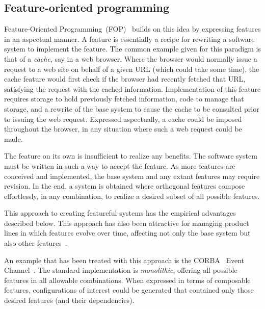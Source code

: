\documentclass[sigplan,anonymous,review]{acmart}
\begin{document}
\subsection{Feature-oriented programming}\label{sec:priorfop}
Feature-Oriented Programming~(FOP)~\cite{prehofer1997feature} builds on this idea by expressing features in an aspectual manner. A feature is essentially a recipe for rewriting a software system to implement the feature. The common example given for this paradigm is that of a \emph{cache}, say in a web browser.  Where the browser would normally issue a request to a web site on behalf of a given URL (which could take some time), the cache feature would first check if the browser had recently fetched that URL, satisfying the request with the cached information. Implementation of this feature requires storage to hold previously fetched information, code to manage that storage, and a rewrite of the base system to cause the cache to be consulted prior to issuing the web request. Expressed aspectually, a cache could be imposed throughout the browser, in any situation where such a web request could be made. 

The feature on its own is insufficient to realize any benefits. The software system must be written in such a way to accept the feature. As more features are conceived and implemented, the base system and any extant features may require revision. In the end, a system is obtained where orthogonal features compose effortlessly, in any combination, to realize a desired subset of all possible features.

This approach to creating featureful systems has the empirical advantages described below. This approach has also been attractive for managing product lines in which features evolve over time, affecting not only the base system but also other features~\cite{10.1145/2897695.2897701}.

An example that has been treated with this approach is the CORBA~\cite{CORBA:00} Event Channel~\cite{CORBAService:02a}. The standard implementation is \emph{monolithic}, offering all possible features in all allowable combinations.    
When expressed in terms of composable features, configurations of interest could be generated that contained only those desired features (and their dependencies).

\end{document}
